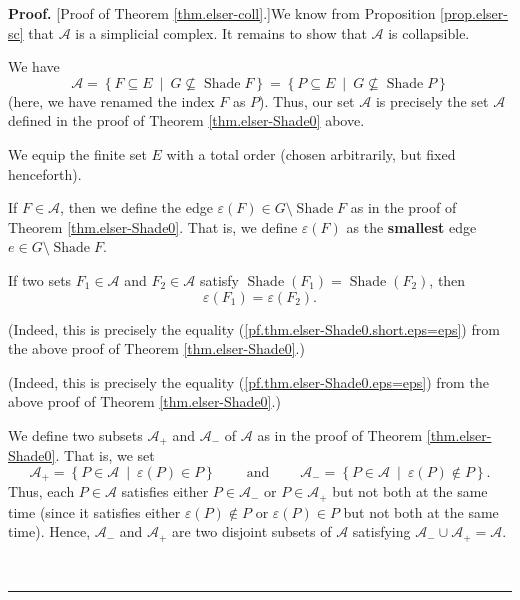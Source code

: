 \documentclass[numbers=enddot,12pt,final,onecolumn]{scrartcl}%
\theoremstyle{definition}
\newenvironment{proof}[1][Proof]{\noindent\textbf{#1.} }{\ \rule{0.5em}{0.5em}}
\newenvironment{verlong}{}{}
\newenvironment{vershort}{}{}
\begin{document}
\begin{proof}
[Proof of Theorem \ref{thm.elser-coll}.]We know from Proposition
\ref{prop.elser-sc} that $\mathcal{A}$ is a simplicial complex. It remains to
show that $\mathcal{A}$ is collapsible.

We have%
\[
\mathcal{A}=\left\{  F\subseteq E\ \mid\ G\not \subseteq \operatorname*{Shade}%
F\right\}  =\left\{  P\subseteq E\ \mid\ G\not \subseteq \operatorname*{Shade}%
P\right\}
\]
(here, we have renamed the index $F$ as $P$). Thus, our set $\mathcal{A}$ is
precisely the set $\mathcal{A}$ defined in the proof of Theorem
\ref{thm.elser-Shade0} above.

We equip the finite set $E$ with a total order (chosen arbitrarily, but fixed henceforth).

If $F\in\mathcal{A}$, then we define the edge $\varepsilon\left(  F\right)
\in G\setminus\operatorname*{Shade}F$ as in the proof of Theorem
\ref{thm.elser-Shade0}. That is, we define $\varepsilon\left(  F\right)  $ as
the \textbf{smallest} edge $e\in G\setminus\operatorname*{Shade}F$.

If two sets $F_{1}\in\mathcal{A}$ and $F_{2}\in\mathcal{A}$ satisfy
$\operatorname*{Shade}\left(  F_{1}\right)  =\operatorname*{Shade}\left(
F_{2}\right)  $, then
\begin{equation}
\varepsilon\left(  F_{1}\right)  =\varepsilon\left(  F_{2}\right)  .
\label{pf.thm.elser-coll.eps=eps}%
\end{equation}


\begin{vershort}
\noindent(Indeed, this is precisely the equality
(\ref{pf.thm.elser-Shade0.short.eps=eps}) from the above proof of Theorem
\ref{thm.elser-Shade0}.)
\end{vershort}

\begin{verlong}
\noindent(Indeed, this is precisely the equality
(\ref{pf.thm.elser-Shade0.eps=eps}) from the above proof of Theorem
\ref{thm.elser-Shade0}.)
\end{verlong}

We define two subsets $\mathcal{A}_{+}$ and $\mathcal{A}_{-}$ of $\mathcal{A}$
as in the proof of Theorem \ref{thm.elser-Shade0}. That is, we set%
\[
\mathcal{A}_{+}=\left\{  P\in\mathcal{A}\ \mid\ \varepsilon\left(  P\right)
\in P\right\}  \ \ \ \ \ \ \ \ \ \ \text{and}\ \ \ \ \ \ \ \ \ \ \mathcal{A}%
_{-}=\left\{  P\in\mathcal{A}\ \mid\ \varepsilon\left(  P\right)  \notin
P\right\}  .
\]
Thus, each $P\in\mathcal{A}$ satisfies either $P\in\mathcal{A}_{-}$ or
$P\in\mathcal{A}_{+}$ but not both at the same time (since it satisfies either
$\varepsilon\left(  P\right)  \notin P$ or $\varepsilon\left(  P\right)  \in
P$ but not both at the same time). Hence, $\mathcal{A}_{-}$ and $\mathcal{A}%
_{+}$ are two disjoint subsets of $\mathcal{A}$ satisfying $\mathcal{A}%
_{-}\cup\mathcal{A}_{+}=\mathcal{A}$.


\end{proof}
\end{document}
